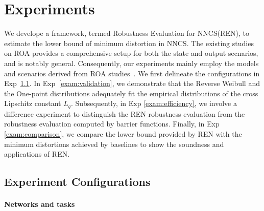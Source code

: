 \documentclass[conference]{IEEEtran}
\newcommand{\ren}{\textsc{REN}\xspace}
\newcommand{\nncs}{\textsc{NNCS}\xspace}
\newcommand{\roa}{\textsc{ROA}\xspace}
\newcommand{\red}[1]{\textcolor{red}{#1}}
\newcommand{\todo}[1]{\red{TODO: #1}}
\begin{document}
\section{Experiments}\label{sec:exp}

We develope a framework, 
termed Robustness Evaluation for \nncs (\ren), 
to estimate the lower bound 
of minimum distortion in \nncs. 
The existing studies on \roa provides 
a comprehensive setup for both the 
state and output secnarios, and is notably general. 
Consequently, our 
experiments mainly employ 
the models and scenarios derived 
from \roa studies~\cite{yanglyapunov}.
We first delineate the configurations in 
Exp~\ref{exam:configuration}. In Exp~\ref{exam:validation}, 
we demonstrate that the 
Reverse Weibull and the One-point distributions 
adequately fit the empirical distributions of the 
cross Lipschitz constant $L_{q}$. 
Subsequently, 
in Exp \ref{exam:efficiency}, 
we involve a difference experiment 
to distinguish the \ren robustness evaluation 
from the robustness 
evaluation computed by barrier functions. 
Finally, in Exp \ref{exam:comparison}, we compare the 
lower bound provided by \ren with the 
minimum distortions achieved by baselines 
to show the soundness and applications of \ren. 



\subsection{Experiment Configurations}\label{exam:configuration}

\paragraph{Networks and tasks}
\end{document}
